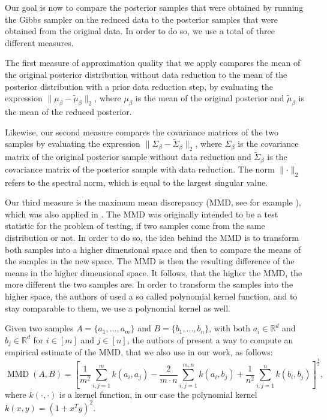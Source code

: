 Our goal is now to compare the posterior samples that were
obtained by running the Gibbs sampler on the reduced data
to the posterior samples that were obtained from the
original data.
In order to do so, we use a total of three different measures.

The first measure of approximation quality that we
apply compares the mean
of the original posterior distribution without data reduction to
the mean of the posterior distribution with a prior data reduction step,
by evaluating the expression
$\lVert \mu_\beta - \widetilde{\mu}_\beta \rVert_2$,
where $\mu_\beta$ is the mean of the original posterior and
$\widetilde{\mu}_\beta$ is the mean of the reduced posterior.

Likewise, our second measure compares the covariance matrices of
the two samples by evaluating the expression
$\lVert \Sigma_\beta - \widetilde{\Sigma}_\beta \rVert_2$,
where $\Sigma_\beta$ is the covariance matrix of the original
posterior sample without data reduction and
$\widetilde{\Sigma}_\beta$ is the covariance matrix of the
posterior sample with data reduction. The norm $\lVert \cdot \rVert_2$
refers to the spectral norm, which is equal to the
largest singular value.

Our third measure is the maximum mean discrepancy (MMD,
see for example \cite{mmd}),
which was also applied in \cite{scalable-bayesian-logreg}.
The MMD was originally intended to be a test statistic for the
problem of testing, if two samples come from the same
distribution or not.
In order to do so, the idea behind the MMD is to transform
both samples into a higher dimensional space and then to
compare the means of the samples in the new space.
The MMD is then the resulting difference of the means in the
higher dimensional space. It follows, that the higher the
MMD, the more different the two samples are.
In order to transform the samples
into the higher space, the authors of
\cite{scalable-bayesian-logreg} used a so called polynomial
kernel function, and to stay comparable to them, we
use a polynomial kernel as well.

Given two samples $A = \{a_1, ..., a_m\}$ and
$B = \{b_1, ..., b_n\}$, with both
$a_i \in \mathbb{R}^d$ and $b_j \in \mathbb{R}^d$ for
$i \in [m]$ and $j \in [n]$, the authors of \cite{mmd} present a way to
compute an empirical estimate of the MMD, that we
also use in our work, as follows:
\begin{equation*}
    \operatorname{MMD}(A, B) = \left[
        \frac{1}{m^2} \sum_{i, j=1}^m k(a_i, a_j)
        - \frac{2}{m \cdot n} \sum_{i, j=1}^{m, n} k(a_i, b_j)
        + \frac{1}{n^2} \sum_{i, j=1}^{n} k(b_i, b_j)
        \right]^\frac{1}{2},
\end{equation*}
where $k(\cdot, \cdot)$ is a kernel function,
in our case the polynomial kernel
$k(x, y) = (1 + x^T y)^2$.

